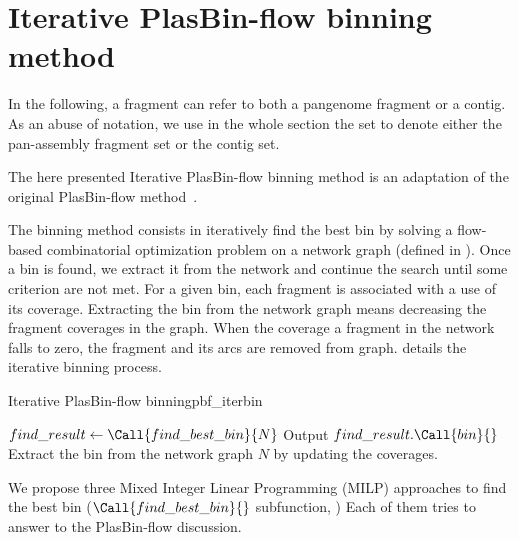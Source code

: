 \section{Iterative PlasBin-flow binning method}

In the following, a fragment can refer to both a pangenome fragment or a contig.
As an abuse of notation, we use in the whole section the set \Fragments{} to denote either the pan-assembly fragment set or the contig set.

The here presented Iterative PlasBin-flow binning method is an adaptation of the original PlasBin-flow method~\cite{manePlasBinflowFlowbasedMILP2023}.

The binning method consists in iteratively find the best bin by solving a flow-based combinatorial optimization problem on a network graph (defined in ).
Once a bin is found, we extract it from the network and continue the search until some criterion are not met.
For a given bin, each fragment is associated with a use of its coverage.
Extracting the bin from the network graph means decreasing the fragment coverages in the graph.
When the coverage a fragment in the network falls to zero, the fragment and its arcs are removed from graph.
 details the iterative binning process.

\begin{tcbalgo}{Iterative PlasBin-flow binning}{pbf_iterbin}
  \begin{algorithmic}[1]
    \State{} \( find\_result \gets \Call{find\_best\_bin}{ N } \)
    \State{} Output \( find\_result.\Call{bin}{ } \)
    \State{} Extract the bin from the network graph \(N\) by updating the coverages.
    \EndIf{}
    \EndWhile{}
    \EndFunction{}
  \end{algorithmic}
\end{tcbalgo}

We propose three Mixed Integer Linear Programming (MILP) approaches to find the best bin (\( \Call{find\_best\_bin}{} \) subfunction, )
Each of them tries to answer to the PlasBin-flow discussion.

